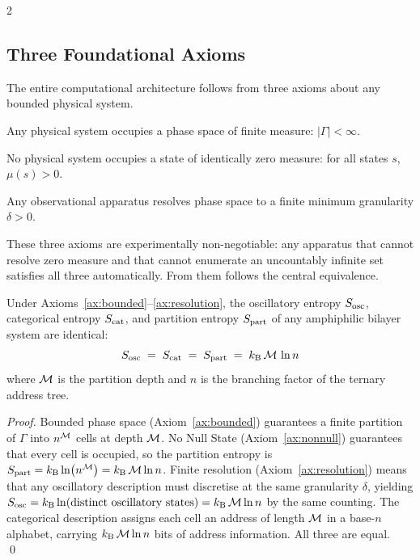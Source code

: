 \begin{multicols}{2}

\subsection{Three Foundational Axioms}

The entire computational architecture follows from three axioms about any bounded physical system.

\begin{axiom}
\label{ax:bounded}
Any physical system occupies a phase space of finite measure: $|\Gamma| < \infty$.
\end{axiom}

\begin{axiom}
\label{ax:nonnull}
No physical system occupies a state of identically zero measure: for all states $s$, $\mu(s) > 0$.
\end{axiom}

\begin{axiom}
\label{ax:resolution}
Any observational apparatus resolves phase space to a finite minimum granularity $\delta > 0$.
\end{axiom}

These three axioms are experimentally non-negotiable: any apparatus that cannot resolve zero measure and that cannot enumerate an uncountably infinite set satisfies all three automatically. From them follows the central equivalence.

\begin{theorem}
\label{thm:ch11_triple}
Under Axioms~\ref{ax:bounded}--\ref{ax:resolution}, the oscillatory entropy $S_{\mathrm{osc}}$, categorical entropy $S_{\mathrm{cat}}$, and partition entropy $S_{\mathrm{part}}$ of any amphiphilic bilayer system are identical:
\begin{equation}
S_{\mathrm{osc}} \;=\; S_{\mathrm{cat}} \;=\; S_{\mathrm{part}} \;=\; k_{\mathrm{B}}\,\mathcal{M}\,\ln n
\label{eq:ch11_triple}
\end{equation}
where $\mathcal{M}$ is the partition depth and $n$ is the branching factor of the ternary address tree.
\end{theorem}

\begin{proof}
Bounded phase space (Axiom~\ref{ax:bounded}) guarantees a finite partition of $\Gamma$ into $n^{\mathcal{M}}$ cells at depth $\mathcal{M}$. No Null State (Axiom~\ref{ax:nonnull}) guarantees that every cell is occupied, so the partition entropy is $S_{\mathrm{part}} = k_{\mathrm{B}} \ln(n^{\mathcal{M}}) = k_{\mathrm{B}}\,\mathcal{M}\ln n$. Finite resolution (Axiom~\ref{ax:resolution}) means that any oscillatory description must discretise at the same granularity $\delta$, yielding $S_{\mathrm{osc}} = k_{\mathrm{B}} \ln(\text{distinct oscillatory states}) = k_{\mathrm{B}}\,\mathcal{M}\ln n$ by the same counting. The categorical description assigns each cell an address of length $\mathcal{M}$ in a base-$n$ alphabet, carrying $k_{\mathrm{B}}\,\mathcal{M}\ln n$ bits of address information. All three are equal. \qed
\end{proof}


\end{multicols}
